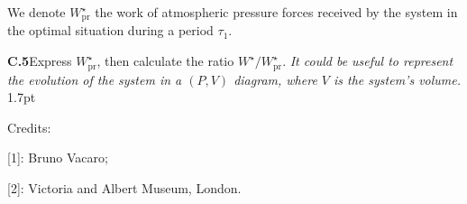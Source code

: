 We denote $W_\mathrm{pr}^\star$ the work of atmospheric pressure forces
received by the system in the optimal situation during a period $\tau_1$.

\textbf{C.5}\quad Express $W_\mathrm{pr}^\star$, then calculate the ratio
$W^\star/W_\mathrm{pr}^\star$. \textit{It could be useful to represent the
evolution of the system in a $(P, V)$ diagram, where $V$ is the system's
volume.} \hfill 1.7pt

Credits:

[1]: Bruno Vacaro;

[2]: Victoria and Albert Museum, London.
